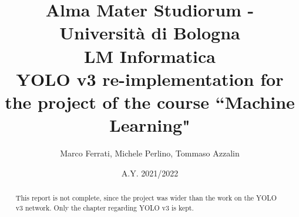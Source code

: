 \documentclass[11pt]{report}
\title{Alma Mater Studiorum - Università di Bologna \\ LM Informatica \\ \textbf{YOLO v3 re-implementation for the project of the course ``Machine Learning"}}
\author{Marco Ferrati, Michele Perlino, Tommaso Azzalin}
\date{A.Y. 2021/2022}
\begin{document}
\maketitle

\begin{abstract}
    This report is not complete, since the project was wider than the work on the YOLO v3 network. Only the chapter regarding YOLO v3 is kept.
\end{abstract}
\clearpage

{
    \setcounter{tocdepth}{2}
    \tableofcontents
}



\cleardoublepage
\appendix


\end{document}
